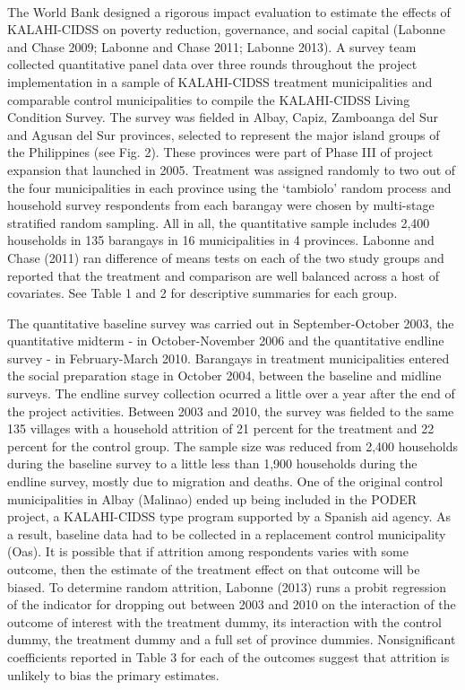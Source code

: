 \documentclass[12pt]{article}
\begin{document}
	\paragraph{ } The World Bank designed a rigorous impact evaluation to estimate the effects of KALAHI-CIDSS on poverty reduction, governance, and social capital (Labonne and Chase 2009; Labonne and Chase 2011; Labonne 2013). A survey team collected quantitative panel data over three rounds throughout the project implementation in a sample of KALAHI-CIDSS treatment municipalities and comparable control municipalities to compile the KALAHI-CIDSS Living Condition Survey. The survey was fielded in Albay, Capiz, Zamboanga del Sur and Agusan del Sur provinces, selected to represent the major island groups of the Philippines (see Fig. 2). These provinces were part of Phase III of project expansion that launched in 2005. Treatment was assigned randomly to two out of the four municipalities in each province using the `tambiolo' random process and household survey respondents from each barangay were chosen by multi-stage stratified random sampling. All in all, the quantitative sample includes 2,400 households in 135 barangays in 16 municipalities in 4 provinces. Labonne and Chase (2011) ran difference of means tests on each of the two study groups and reported that the treatment and comparison are well balanced across a host of covariates. See Table 1 and 2 for descriptive summaries for each group.  

	The quantitative baseline survey was carried out in September-October 2003, the quantitative midterm - in October-November 2006 and the quantitative endline survey - in February-March 2010. Barangays in treatment municipalities entered the social preparation stage in October 2004, between the baseline and midline surveys. The endline survey collection ocurred a little over a year after the end of the project activities. Between 2003 and 2010, the survey was fielded to the same 135 villages with a household attrition of 21 percent for the treatment and 22 percent for the control group. The sample size was reduced from 2,400 households during the baseline survey to a little less than 1,900 households during the endline survey, mostly due to migration and deaths. One of the original control municipalities in Albay (Malinao) ended up being included in the PODER project, a KALAHI-CIDSS type program supported by a Spanish aid agency. As a result, baseline data had to be collected in a replacement control municipality (Oas). It is possible that if attrition among respondents varies with some outcome, then the estimate of the treatment effect on that outcome will be biased. To determine random attrition, Labonne (2013) runs a probit regression of the indicator for dropping out between 2003 and 2010 on the interaction of the outcome of interest with the treatment dummy, its interaction with the control dummy, the treatment dummy and a full set of province dummies. Nonsignificant coefficients reported in Table 3 for each of the outcomes suggest that attrition is unlikely to bias the primary estimates. 
\end{document}
